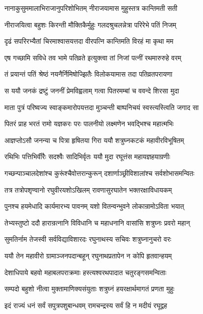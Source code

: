 \twolineshloka
{नानाकुसुममालाभिराजानुपरिशोभितम्}
{नीराजयामास मुहुस्तत्र कान्तिमती सती}%

\twolineshloka
{नीराजयित्वा बहुशः किरन्ती मौक्तिकैर्मुहुः}
{गलदश्रुचलन्नेत्रा परिरेभे पतिं निजम्}%

\twolineshloka
{दृढं सपरिरभ्यैतां चिरमाश्वासयत्तदा}
{वीरपत्नि कान्तिमति विरहं मा कृथा मम}%

\twolineshloka
{एष गच्छामि सविधे तव भामे पतिव्रते}
{इत्युक्त्वा तां निजां पत्नीं रथमारुरुहे वरम्}%

\twolineshloka
{तं प्रयान्तं पतिं श्रेष्ठं नयनैर्निमिषोज्झितैः}
{विलोकयामास तदा पतिव्रतपरायणा}%

\twolineshloka
{स ययौ जनकं द्रष्टुं जननीं प्रेमविह्वलाम्}
{गत्वा पितरमम्बां च ववन्दे शिरसा मुदा}%

\twolineshloka
{माता पुत्रं परिष्वज्य स्वाङ्कमारोपयत्तदा}
{मुञ्चन्ती बाष्पनिचयं स्वस्त्यस्त्विति जगाद सा}%

\twolineshloka
{पितरं प्राह भरतं रामो यज्ञकरः परः}
{पालनीयो लक्ष्मणेन भवद्भिश्च महात्मभिः}%

\twolineshloka
{आज्ञप्तोऽसौ जनन्या च पित्रा हृषितया गिरा}
{ययौ शत्रुघ्नकटकं महावीरविभूषितम्}%

\twolineshloka
{रथिभिः पत्तिभिर्वीरैः सदश्वैः सादिभिर्वृतः}
{ययौ मुदा रघूत्तंस महायज्ञहयाग्रणीः}%

\twolineshloka
{गच्छन्पाञ्चालदेशांश्च कुरूंश्चैवोत्तरान्कुरून्}
{दशार्णाञ्छ्रीविशालांश्च सर्वशोभासमन्वितः}%

\twolineshloka
{तत्र तत्रोपशृण्वानो रघुवीरयशोऽखिलम्}
{रावणासुरघातेन भक्तरक्षाविधायकम्}%

\twolineshloka
{पुनश्च हयमेधादि कार्यमारभ्य पावनम्}
{यशो वितन्वन्भुवने लोकान्रामोऽविता भयात्}%

\twolineshloka
{तेभ्यस्तुष्टो ददौ हारान्रत्नानि विविधानि च}
{महाधनानि वासांसि शत्रुघ्नः प्रवरो महान्}%

\twolineshloka
{सुमतिर्नाम तेजस्वी सर्वविद्याविशारदः}
{रघुनाथस्य सचिवः शत्रुघ्नानुचरो वरः}%

\twolineshloka
{ययौ तेन महावीरो ग्रामाञ्जनपदान्बहून्}
{रघुनाथप्रतापेन न कोपि हृतवान्हयम्}%

\twolineshloka
{देशाधिपाये बहवो महाबलपराक्रमाः}
{हस्त्यश्वरथपादात चतुरङ्गसमन्विताः}%

\twolineshloka
{सम्पदो बहुशो नीत्वा मुक्तामाणिक्यसंयुताः}
{शत्रुघ्नं हयरक्षार्थमागतं प्रणता मुहुः}%

\twolineshloka
{इदं राज्यं धनं सर्वं सपुत्रपशुबान्धवम्}
{रामचन्द्रस्य सर्वं हि न मदीयं रघूद्वह}%

